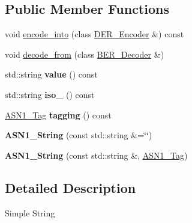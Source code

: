 \subsection*{Public Member Functions}
\begin{DoxyCompactItemize}
\item 
void \hyperlink{classBotan_1_1ASN1__String_a2c54ccc5e49be2d3cf54a5b3070f5e43}{encode\-\_\-into} (class \hyperlink{classBotan_1_1DER__Encoder}{D\-E\-R\-\_\-\-Encoder} \&) const 
\item 
void \hyperlink{classBotan_1_1ASN1__String_a9c73ac74c6437e4dfaa509ffad6c9b2c}{decode\-\_\-from} (class \hyperlink{classBotan_1_1BER__Decoder}{B\-E\-R\-\_\-\-Decoder} \&)
\item 
\hypertarget{classBotan_1_1ASN1__String_a7ebd6cb0de78535947dd6634b9b58266}{std\-::string {\bfseries value} () const }\label{classBotan_1_1ASN1__String_a7ebd6cb0de78535947dd6634b9b58266}

\item 
\hypertarget{classBotan_1_1ASN1__String_a5e4b8fee78ae6d885497a41529c16a9e}{std\-::string {\bfseries iso\-\_} () const }\label{classBotan_1_1ASN1__String_a5e4b8fee78ae6d885497a41529c16a9e}

\item 
\hypertarget{classBotan_1_1ASN1__String_a83060269fe89327acd316a95f5acb5fc}{\hyperlink{namespaceBotan_aaa08f67a945ef195fa39e62659dffa7a}{A\-S\-N1\-\_\-\-Tag} {\bfseries tagging} () const }\label{classBotan_1_1ASN1__String_a83060269fe89327acd316a95f5acb5fc}

\item 
\hypertarget{classBotan_1_1ASN1__String_a3ff0a797b8ffc02a7bf85519c1f972c4}{{\bfseries A\-S\-N1\-\_\-\-String} (const std\-::string \&=\char`\"{}\char`\"{})}\label{classBotan_1_1ASN1__String_a3ff0a797b8ffc02a7bf85519c1f972c4}

\item 
\hypertarget{classBotan_1_1ASN1__String_acf0363e96d73fde64df72c1640e166d9}{{\bfseries A\-S\-N1\-\_\-\-String} (const std\-::string \&, \hyperlink{namespaceBotan_aaa08f67a945ef195fa39e62659dffa7a}{A\-S\-N1\-\_\-\-Tag})}\label{classBotan_1_1ASN1__String_acf0363e96d73fde64df72c1640e166d9}

\end{DoxyCompactItemize}


\subsection{Detailed Description}
Simple String 

